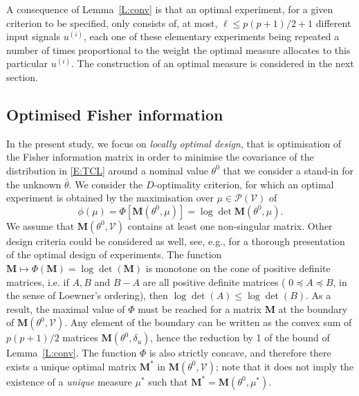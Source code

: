 \documentclass[a4paper]{article}
\newcommand{\Luc}{\color{magenta} }
\theoremstyle{definition}
\theoremstyle{remark}
\newcommand{\V}{\mathcal{V}}
\renewcommand{\P}{\mathcal{P}}
\newcommand{\Mb}{\mathbf{M}}
\begin{document}
A consequence of Lemma~\ref{L:conv} is that an optimal experiment, for a given criterion to be specified, only consists of, at most, $\ell\leq p(p+1)/2+1$ different input signals $u^{(i)}$, each one of these elementary experiments being repeated a number of times proportional to the weight the optimal measure allocates to this particular $u^{(i)}$. The construction of an optimal measure is considered in the next section. 

\subsection{Optimised Fisher information}

In the present study, we focus on \textit{locally optimal design}, that is optimisation of the Fisher information matrix in order to minimise the covariance of the distribution in \eqref{E:TCL} around a nominal value $\theta^0$ that we consider a stand-in for the unknown $\bar\theta$. We consider the $D$-optimality criterion, for which an optimal experiment is obtained by the maximisation over $\mu\in \P(\V)$ of
$$
\phi(\mu)=\Phi[\Mb(\theta^0,\mu)] = \log \det \Mb(\theta^0,\mu).
$$
{\Luc We assume that $\Mb(\theta^0,\V)$ contains at least one non-singular matrix. Other design criteria could be considered as well, see, e.g., \cite{Fedorov72, Silvey80, Pukelsheim2006} for a thorough presentation of the optimal design of experiments.}
The function $\Mb\mapsto \Phi(\Mb)=\log \det(\Mb)$ is monotone on the cone of positive definite matrices, i.e. if $A,B$ and $B-A$ are all positive definite matrices ({\Luc $0\preceq A\preceq B$, in the sense of Loewner's ordering}), then $\log \det(A)\leq \log \det (B)$. {\Luc As a result, the maximal value of $\Phi$ must be reached for a matrix $\Mb$ at the boundary of $\Mb(\theta^0,\V)$.
Any element of the boundary can be written as the convex sum of $p(p+1)/2$ matrices $\Mb(\theta^0, \delta_u)$, hence the reduction by 1 of the bound of Lemma~\ref{L:conv}. The function $\Phi$ is also strictly concave, and therefore there exists a unique optimal matrix $\Mb^*$ in $\Mb(\theta^0,\V)$; note that it does not imply the existence of a {\em unique} measure $\mu^*$ such that $\Mb^*=\Mb(\theta^0,\mu^*)$.}
\end{document}
